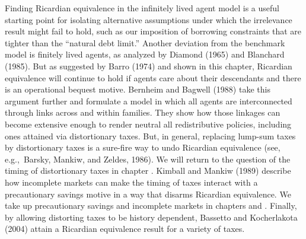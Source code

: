 Finding  Ricardian equivalence in the infinitely lived agent model
is a useful starting point for isolating alternative assumptions under
which the irrelevance result might fail to hold,%
such as our imposition of borrowing constraints that are tighter
than the ``natural debt limit.''
Another deviation from the benchmark model is finitely lived agents,
as analyzed by Diamond (1965) and Blanchard (1985).
But as suggested by Barro (1974)
and shown in this chapter, Ricardian equivalence will
continue to hold if agents care about their descendants
and there is an operational bequest motive.
 Bernheim and Bagwell (1988)
take this argument further and formulate a model in which all
agents are interconnected through links across and within families.
  They show how those linkages can become extensive enough  to render neutral all redistributive
policies, including ones attained via distortionary taxes. But, in general, replacing
lump-sum taxes by distortionary taxes is a sure-fire way to undo
Ricardian equivalence (see, e.g.,\ Barsky, Mankiw, and Zeldes, 1986).
We will return to the question of the timing of distortionary
taxes in chapter . Kimball and Mankiw (1989) describe
how incomplete markets can make the timing of taxes interact with
a precautionary savings motive in a way that disarms
Ricardian equivalence.    We take up precautionary savings and
incomplete markets in chapters  and
.  Finally, by
allowing distorting taxes to be history dependent, Bassetto and
Kocherlakota (2004) attain a Ricardian equivalence result for a
variety of taxes.
  
 



